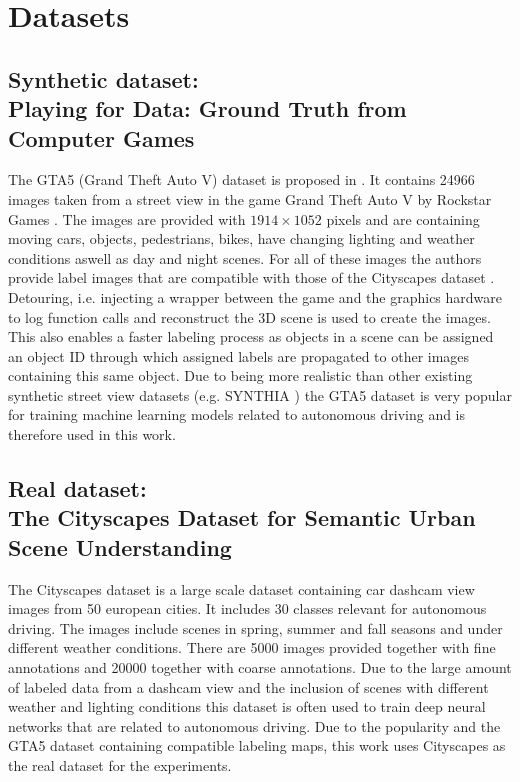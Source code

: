 \section{Datasets}

\subsection{Synthetic dataset: \\
	Playing for Data: Ground Truth from Computer Games}

The GTA5 (Grand Theft Auto V) dataset is proposed in \cite{Richter_2016_ECCV}. It contains 24966 images taken from a street view in the game Grand Theft Auto V by Rockstar Games \cite{GTAV}. The images are provided with $1914 \times 1052$ pixels and are containing moving cars, objects, pedestrians, bikes, have changing lighting and weather conditions aswell as day and night scenes. For all of these images the authors provide label images that are compatible with those of the Cityscapes dataset \cite{Cordts_2016_CVPR}. Detouring, i.e. injecting a wrapper between the game and the graphics hardware to log function calls and reconstruct the 3D scene is used to create the images. This also enables a faster labeling process as objects in a scene can be assigned an object ID through which assigned labels are propagated to other images containing this same object. Due to being more realistic than other existing synthetic street view datasets (e.g. SYNTHIA \cite{RosCVPR16}) the GTA5 dataset is very popular for training machine learning models related to autonomous driving and is therefore used in this work.


\subsection{Real dataset:\\
	The Cityscapes Dataset for Semantic Urban Scene Understanding}

The Cityscapes dataset \cite{Cordts_2016_CVPR} is a large scale dataset containing car dashcam view images from 50 european cities. It includes 30 classes relevant for autonomous driving. The images include scenes in spring, summer and fall seasons and under different weather conditions. There are 5000 images provided together with fine annotations and 20000 together with coarse annotations. Due to the large amount of labeled data from a dashcam view and the inclusion of scenes with different weather and lighting conditions this dataset is often used to train deep neural networks that are related to autonomous driving. Due to the popularity and the GTA5 dataset containing compatible labeling maps, this work uses Cityscapes as the real dataset for the experiments.

